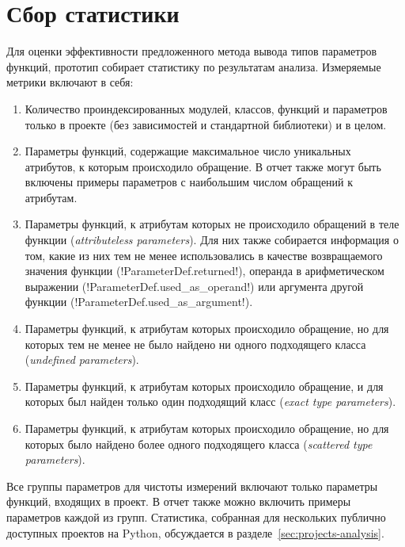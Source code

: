\section{Сбор статистики}
\label{sec:statistics-collecting}

Для оценки эффективности предложенного метода вывода типов параметров функций,
прототип собирает статистику по результатам анализа. Измеряемые метрики включают
в себя:

\begin{enumerate}
  \item Количество проиндексированных модулей, классов, функций и параметров
    только в проекте (без зависимостей и стандартной библиотеки) и в целом.

  \item Параметры функций, содержащие максимальное число уникальных атрибутов, к
    которым происходило обращение. В отчет также могут быть включены примеры
    параметров с наибольшим числом обращений к атрибутам.

  \item Параметры функций, к атрибутам которых не происходило обращений в теле
    функции (\emph{attributeless parameters}). Для них также
    собирается информация о том, какие из них тем не менее использовались в
    качестве возвращаемого значения функции (!ParameterDef.returned!), операнда
    в арифметическом выражении (!ParameterDef.used_as_operand!) или аргумента
    другой функции (!ParameterDef.used_as_argument!).

  \item Параметры функций, к атрибутам которых происходило обращение, но для
    которых тем не менее не было найдено ни одного подходящего класса
    (\emph{undefined parameters}).

  \item Параметры функций, к атрибутам которых происходило обращение, и для
    которых был найден только один подходящий класс (\emph{exact type parameters}).

  \item Параметры функций, к атрибутам которых происходило обращение, но для
    которых было найдено более одного подходящего класса (\emph{scattered type
      parameters}).

\end{enumerate}

Все группы параметров для чистоты измерений включают только параметры функций,
входящих в проект. В отчет также можно включить примеры параметров каждой из групп.
Статистика, собранная для нескольких публично доступных проектов на Python, обсуждается
в разделе~\ref{sec:projects-analysis}.

